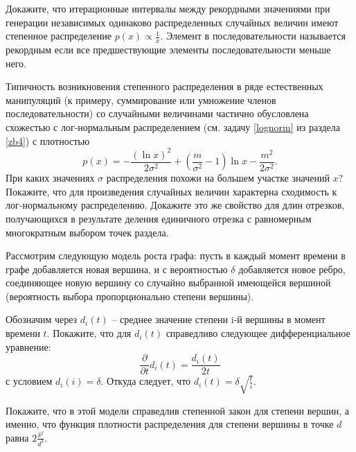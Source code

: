 \begin{problem}
Докажите, что итерационные интервалы между рекордными значениями при генерации независимых одинаково распределенных случайных величин имеют степенное распределение $p(x) \propto \frac{1}{x}.$ Элемент в последовательности называется  рекордным если все   предшествующие элементы последовательности меньше него.
\end{problem}

\begin{problem}
Типичность возникновения степенного распределения в ряде естественных манипуляций (к примеру, суммирование или умножение членов последовательности) со случайными величинами частично обусловлена схожестью с лог-нормальным распределением (см. задачу \ref{lognorm} из раздела \ref{zb4}) с плотностью
\[
p(x) = - \frac{(\ln x)^2}{2 \sigma^2} + \left( \frac{m}{\sigma^2} - 1 \right) \ln x  - \frac{m^2}{2 \sigma^2}.
\]    
При каких значениях $ \sigma$ распределения  похожи на большем участке значений $x$?
Покажите, что для произведения случайных величин характерна сходимость к лог-нормальному распределению. Докажите это же свойство для длин отрезков, получающихся в результате деления единичного отрезка с равномерным многократным выбором точек раздела.     
\end{problem}



\begin{problem}

Рассмотрим следующую модель роста графа: пусть в каждый момент времени в 
графе добавляется новая вершина, и с вероятностью $\delta $ добавляется новое 
ребро, соединяющее новую вершину со случайно выбранной имеющейся вершиной 
(вероятность выбора пропорционально степени вершины).

Обозначим через $d_i (t)$ -- среднее значение степени i-й вершины в момент 
времени $t$. Покажите, что для $d_i (t)$ справедливо следующее 
дифференциальное уравнение:
\[
\frac{\partial }{\partial t}d_i (t)=\frac{d_i (t)}{2t}
\]
с условием $d_i (i)=\delta $. Откуда следует, что $d_i (t)=\delta \sqrt 
{\frac{t}{i}} $.

Покажите, что в этой модели справедлив степенной закон для степени вершин, а 
именно, что функция плотности распределения для степени вершины в точке $d$ 
равна $2\frac{\delta ^2}{d^3}$.
\end{problem}





